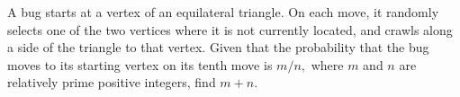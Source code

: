 A bug starts at a vertex of an equilateral triangle. On each move, it randomly selects one of the two vertices where it is not currently located, and crawls along a side of the triangle to that vertex. Given that the probability that the bug moves to its starting vertex on its tenth move is $m/n,$ where $m$ and $n$ are relatively prime positive integers, find $m+n.$
